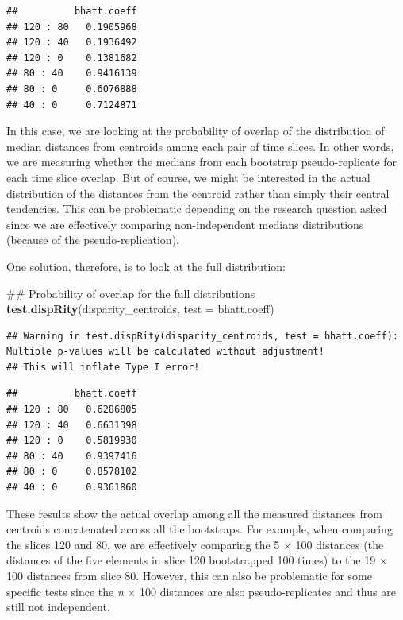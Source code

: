 \documentclass[]{book}
\newenvironment{Shaded}{\begin{snugshade}}{\end{snugshade}}
\newcommand{\KeywordTok}[1]{\textcolor[rgb]{0.13,0.29,0.53}{\textbf{#1}}}
\newcommand{\DataTypeTok}[1]{\textcolor[rgb]{0.13,0.29,0.53}{#1}}
\newcommand{\NormalTok}[1]{#1}
\theoremstyle{definition}
\theoremstyle{definition}
\theoremstyle{remark}
\begin{document}
\begin{verbatim}
##          bhatt.coeff
## 120 : 80   0.1905968
## 120 : 40   0.1936492
## 120 : 0    0.1381682
## 80 : 40    0.9416139
## 80 : 0     0.6076888
## 40 : 0     0.7124871
\end{verbatim}

In this case, we are looking at the probability of overlap of the
distribution of median distances from centroids among each pair of time
slices. In other words, we are measuring whether the medians from each
bootstrap pseudo-replicate for each time slice overlap. But of course,
we might be interested in the actual distribution of the distances from
the centroid rather than simply their central tendencies. This can be
problematic depending on the research question asked since we are
effectively comparing non-independent medians distributions (because of
the pseudo-replication).

One solution, therefore, is to look at the full distribution:

\begin{Shaded}
\begin{Highlighting}[]
\NormalTok{## Probability of overlap for the full distributions}
\KeywordTok{test.dispRity}\NormalTok{(disparity_centroids, }\DataTypeTok{test =}\NormalTok{ bhatt.coeff)}
\end{Highlighting}
\end{Shaded}

\begin{verbatim}
## Warning in test.dispRity(disparity_centroids, test = bhatt.coeff): Multiple p-values will be calculated without adjustment!
## This will inflate Type I error!
\end{verbatim}

\begin{verbatim}
##          bhatt.coeff
## 120 : 80   0.6286805
## 120 : 40   0.6631398
## 120 : 0    0.5819930
## 80 : 40    0.9397416
## 80 : 0     0.8578102
## 40 : 0     0.9361860
\end{verbatim}

These results show the actual overlap among all the measured distances
from centroids concatenated across all the bootstraps. For example, when
comparing the slices 120 and 80, we are effectively comparing the 5
\(\times\) 100 distances (the distances of the five elements in slice
120 bootstrapped 100 times) to the 19 \(\times\) 100 distances from
slice 80. However, this can also be problematic for some specific tests
since the \emph{n} \(\times\) 100 distances are also pseudo-replicates
and thus are still not independent.
\end{document}
